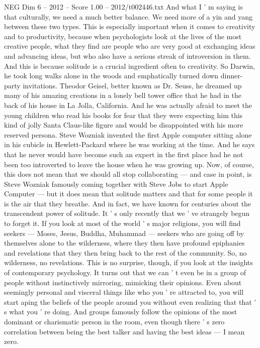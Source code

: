\begin{textsample}{NEG Dim 6 – 2012 – Score 1.00 – 2012/t002446.txt}
And what I ' m saying is that culturally, we need a much better balance.
We need more of a yin and yang between these two types.
This is especially important when it comes to creativity and to productivity, because when psychologists look at the lives of the most creative people, what they find are people who are very good at exchanging ideas and advancing ideas, but who also have a serious streak of introversion in them.
And this is because solitude is a crucial ingredient often to creativity.
So Darwin, he took long walks alone in the woods and emphatically turned down dinner-party invitations.
Theodor Geisel, better known as Dr.
Seuss, he dreamed up many of his amazing creations in a lonely bell tower office that he had in the back of his house in La Jolla, California.
And he was actually afraid to meet the young children who read his books for fear that they were expecting him this kind of jolly Santa Claus-like figure and would be disappointed with his more reserved persona.
Steve Wozniak invented the first Apple computer sitting alone in his cubicle in Hewlett-Packard where he was working at the time.
And he says that he never would have become such an expert in the first place had he not been too introverted to leave the house when he was growing up.
Now, of course, this does not mean that we should all stop collaborating — and case in point, is Steve Wozniak famously coming together with Steve Jobs to start Apple Computer — but it does mean that solitude matters and that for some people it is the air that they breathe.
And in fact, we have known for centuries about the transcendent power of solitude.
It ' s only recently that we ' ve strangely begun to forget it.
If you look at most of the world ' s major religions, you will find seekers — Moses, Jesus, Buddha, Muhammad — seekers who are going off by themselves alone to the wilderness, where they then have profound epiphanies and revelations that they then bring back to the rest of the community.
So, no wilderness, no revelations.
This is no surprise, though, if you look at the insights of contemporary psychology.
It turns out that we can ' t even be in a group of people without instinctively mirroring, mimicking their opinions.
Even about seemingly personal and visceral things like who you ' re attracted to, you will start aping the beliefs of the people around you without even realizing that that ' s what you ' re doing.
And groups famously follow the opinions of the most dominant or charismatic person in the room, even though there ' s zero correlation between being the best talker and having the best ideas — I mean zero.

\end{textsample}

